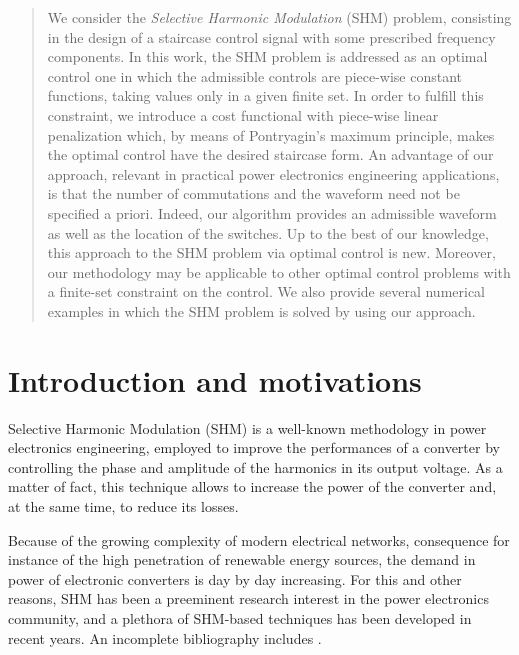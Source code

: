 \documentclass[twocolumn]{autart}    %
\begin{document}
\begin{frontmatter}
\begin{abstract}                          %
We consider the \emph{Selective Harmonic Modulation} (SHM) problem, consisting in the design of a staircase control signal with some prescribed frequency components. In this work, the SHM problem is addressed as an optimal control one in which the admissible controls are piece-wise constant functions, taking values only in a given finite set. In order to fulfill this constraint, we  introduce a cost functional with piece-wise linear penalization which, by means of Pontryagin's maximum principle, makes the optimal control have the desired staircase form. An advantage of our approach, relevant in practical power electronics engineering applications, is that the number of commutations and the waveform need not be specified a priori. Indeed, our algorithm provides an admissible waveform as well as the location of the switches. Up to the best of our knowledge, this approach to the SHM problem via optimal control is new. Moreover, our methodology may be applicable to other optimal control problems with a finite-set constraint on the control. We also provide several numerical examples in which the SHM problem is solved by using our approach.
\end{abstract}

\end{frontmatter}


\section{Introduction and motivations}\label{Section1}

Selective Harmonic Modulation (SHM) \cite{Rodriguez2002} is a well-known methodology in power electronics engineering, employed to improve the performances of a converter by controlling the phase and amplitude of the harmonics in its output voltage. As a matter of fact, this technique allows to increase the power of the converter and, at the same time, to reduce its losses. 

Because of the growing complexity of modern electrical networks, consequence for instance of the high penetration of renewable energy sources, the demand in power of electronic converters is day by day increasing. For this and other reasons, SHM has been a preeminent research interest in the power electronics community, and a plethora of SHM-based techniques has been developed in recent years. An incomplete bibliography includes \cite{duranay2017selective,Janabi2020,Yang2017}.
\end{document}
